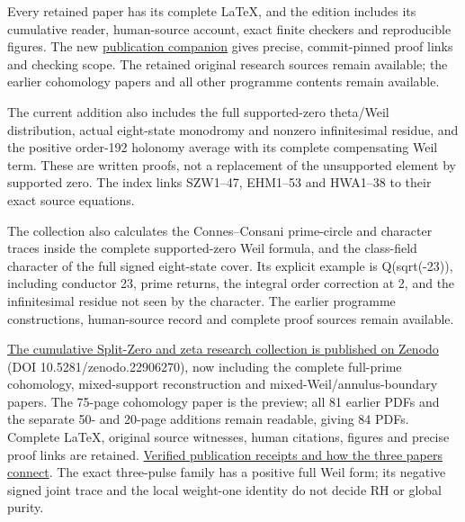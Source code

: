 \documentclass[
]{article}
\begin{document}
Every retained paper has its complete LaTeX, and the edition includes
its cumulative reader, human-source account, exact finite checkers and
reproducible figures. The new
\href{https://github.com/KokunoYumeto/zeta-function-research-reader/blob/main/workbenches/splitzero-tandem/branches/tau-zero-prime-positivity/PUBLICATION_COMPANION.md}{publication
companion} gives precise, commit-pinned proof links and checking scope.
The retained original research sources remain available; the earlier
cohomology papers and all other programme contents remain available.

The current addition also includes the full supported-zero theta/Weil
distribution, actual eight-state monodromy and nonzero infinitesimal
residue, and the positive order-192 holonomy average with its complete
compensating Weil term. These are written proofs, not a replacement of
the unsupported element by supported zero. The index links SZW1--47,
EHM1--53 and HWA1--38 to their exact source equations.

The collection also calculates the Connes--Consani prime-circle and
character traces inside the complete supported-zero Weil formula, and
the class-field character of the full signed eight-state cover. Its
explicit example is Q(sqrt(-23)), including conductor 23, prime returns,
the integral order correction at 2, and the infinitesimal residue not
seen by the character. The earlier programme constructions, human-source
record and complete proof sources remain available.

\href{https://zenodo.org/records/22906270}{The cumulative Split-Zero and
zeta research collection is published on Zenodo} (DOI
10.5281/zenodo.22906270), now including the complete full-prime
cohomology, mixed-support reconstruction and mixed-Weil/annulus-boundary
papers. The 75-page cohomology paper is the preview; all 81 earlier PDFs
and the separate 50- and 20-page additions remain readable, giving 84
PDFs. Complete LaTeX, original source witnesses, human citations,
figures and precise proof links are retained.
\href{https://github.com/KokunoYumeto/zeta-function-research-reader/blob/main/workbenches/splitzero-tandem/continuations/20260923-full-prime-support-publication/README.md}{Verified
publication receipts and how the three papers connect}. The exact
three-pulse family has a positive full Weil form; its negative signed
joint trace and the local weight-one identity do not decide RH or global
purity.
\end{document}

